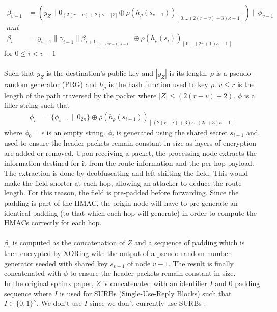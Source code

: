         
    \begin{align}  
            \beta_{v-1} &=(y_Z\|0_{(2(r-v)+2)\kappa-|Z|}\oplus \rho(h_{\rho}(s_{v-1}))_{[ \,0....(2(r-v)+3)\kappa-1\,]})\|\phi_{v-1}\\
            and &\nonumber \\
            \beta_i &=y_{i+1}\|\gamma_{i+1}\|\beta_{{i+1}_{[ \,0....(2r-1)\kappa-1\,] }}\oplus \rho(h_{\rho}(s_{i}))_{[ \,0....(2r+1)\kappa-1\,]} 
    \end{align}
for $0\le i < v-1$
    \\~\\Such that $y_Z$ is the destination's public key and $|y_Z|$ is its length. $\rho$ is a pseudo-random generator (PRG) and $h_{\rho}$ is the hash function used to key $\rho$.
    $v\leq r$ is the length of the path traversed by the packet where $|Z| \leq (2(r - v) + 2)$. $\phi$ is a filler string such that
    \begin{align}  
        \phi_i&=\{ \phi_{i-1}\|0_{2\kappa}\}\oplus \rho(h_{\rho}(s_{i-1}))_{[ \,(2(r-i)+3)\kappa..(2r+3)\kappa-1\,]}
\end{align}
where $\phi_0=\epsilon$ is an empty string. $\phi_i$ is generated using the shared secret $s_{i-1}$ and used to ensure the header packets remain constant in size as layers of encryption are added or removed. Upon receiving a packet, the processing node extracts the information destined for it from the route information and the per-hop payload. The extraction is done by deobfuscating and left-shifting the field. This would make the field shorter at each hop, allowing an attacker to deduce the route length. For this reason, the field is pre-padded before forwarding. Since the padding is part of the HMAC, the origin node will have to pre-generate an identical padding (to that which each hop will generate) in order to compute the HMACs correctly for each hop.
    \\~\\$\beta_i$ is computed as the concatenation of $Z$ and a sequence of padding which is then encrypted by XORing with the output of a pseudo-random number generator seeded with shared key $s_{v-1}$ of node $v-1$. The result is finally concatenated with $\phi$ to ensure the header packets remain constant in size.
    \\In the original sphinx paper, $Z$ is concatenated with an identifier $I$ and $0$ padding sequence where $I$ is used for SURBs (Single-Use-Reply Blocks) such that $I \in \{0, 1\}^\kappa$. We don't use $I$ since we don't currently use SURBs .
